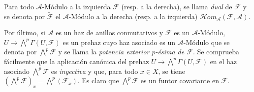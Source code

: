 \begin{env}[4.1.5]
Para todo $\mathcal{A}$-Módulo a la izquierda $\mathcal{F}$ (resp. a la
derecha), se llama \emph{dual} de $\mathcal{F}$ y se denota por
$\check{\mathcal{F}}$ el $\mathcal{A}$-Módulo a la derecha (resp. a la
izquierda) $\mathcal{H}\!om_{\mathcal{A}}(\mathcal{F},\mathcal{A})$.

Por último, si $\mathcal{A}$ es un haz de anillos conmutativos y
$\mathcal{F}$ es un $\mathcal{A}$-Módulo,
$U\to\bigwedge^p\Gamma(U,\mathcal{F})$ es un prehaz cuyo haz asociado es un
$\mathcal{A}$-Módulo que se denota por
$\bigwedge^p\mathcal{F}$ y se llama la \emph{potencia exterior $p$-ésima
de $\mathcal{F}$}. Se comprueba fácilmente que la aplicación canónica del
prehaz $U\to\bigwedge^p\Gamma(U,\mathcal{F})$ en el haz asociado
$\bigwedge^p\mathcal{F}$ es \emph{inyectiva} y que, para todo
$x\in X$, se tiene
$(\bigwedge^p\mathcal{F})_x=\bigwedge^p(\mathcal{F}_x)$. Es claro que
$\bigwedge^p\mathcal{F}$ es un funtor covariante en $\mathcal{F}$.
\end{env}

